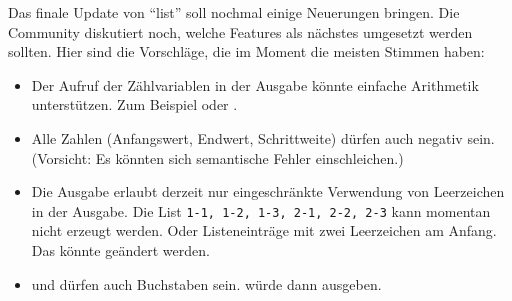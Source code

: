 \documentclass[fontsize=10pt, a4paper, ngerman]{scrartcl}
\begin{document}
\begin{aufgabe}[subtitle=list 6.0]
	\label{aufg:list-v6}
	Das finale Update von \enquote{list} soll nochmal einige Neuerungen bringen. Die Community
	diskutiert noch, welche Features als nächstes umgesetzt werden sollten. Hier sind die Vorschläge,
	die im Moment die meisten Stimmen haben:

	\begin{itemize}
		\item Der Aufruf der Zählvariablen in der Ausgabe könnte einfache Arithmetik unterstützen.
			Zum Beispiel  oder .
		\item Alle Zahlen (Anfangswert, Endwert, Schrittweite) dürfen auch negativ sein. (Vorsicht:
			Es könnten sich semantische Fehler einschleichen.)
		\item Die Ausgabe erlaubt derzeit nur eingeschränkte Verwendung von Leerzeichen in der Ausgabe.
			Die List \verb|1-1, 1-2, 1-3, 2-1, 2-2, 2-3| kann momentan nicht erzeugt werden. Oder
			Listeneinträge mit zwei Leerzeichen am Anfang. Das könnte geändert werden.
		\item {} und  dürfen auch Buchstaben sein. 
			würde dann  ausgeben.
	\end{itemize}
\end{aufgabe}
\end{document}
